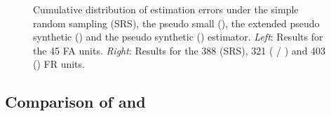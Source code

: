 \begin{figure}[H]
	\centering
	\caption{Cumulative distribution of estimation errors under the simple random sampling (SRS), the pseudo small (\psmall{}), the extended pseudo synthetic (\extpsynth{}) and the pseudo synthetic (\psynth{}) estimator. \textit{Left}: Results for the 45 FA units. \textit{Right}: Results for the 388 (SRS), 321 (\psmall{} / \extpsynth{}) and 403 (\psynth{}) FR units.}
	\label{fig:disterrors}
\end{figure}


%
%
%
%
%
%
%



\newpage
\subsection{Comparison of \psmall{} and \extpsynth{}}
\label{sec:comp}

